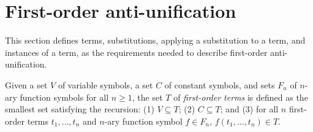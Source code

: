\section{First-order anti-unification}   \label{AU}

This section defines terms, substitutions, applying a substitution to a term, and instances of a term, as the requirements needed to describe first-order anti-unification.

\begin{defn}\label{def:term}
Given a set $V$ of variable symbols, a set $C$ of constant symbols, and sets $F_n$ of $n$-ary function symbols for all $n\ge1$, the set $T$ of \emph{first-order terms} is defined as the smallest set satisfying the recursion: (1) $V\subseteq T$; (2) $C\subseteq T$; and (3) for all $n$ first-order terms $t_1, \ldots, t_n$ and $n$-ary function symbol $f\in F_n$,  $f(t_1, \ldots, t_n) \in T$.
\end{defn}

